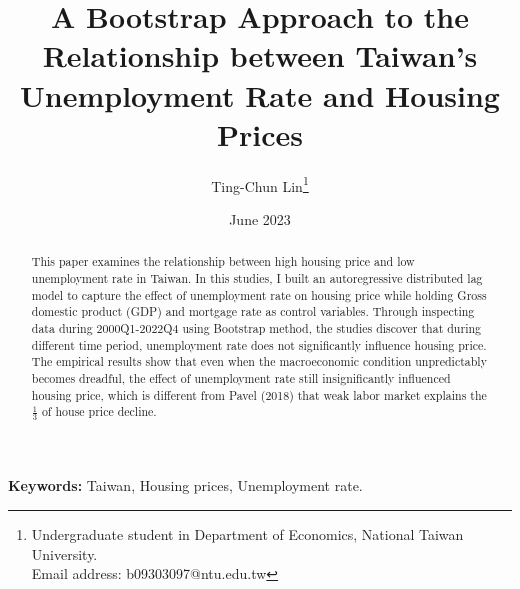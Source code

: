 \documentclass[12pt]{article}
\title{ A Bootstrap Approach to the Relationship between Taiwan's Unemployment Rate and Housing Prices }
\author{Ting-Chun Lin\thanks{
Undergraduate student in Department of Economics, National Taiwan University.\\ Email address: b09303097@ntu.edu.tw
}
}
\date{June 2023}
\begin{document}
\maketitle

\begin{abstract}
{  
    This paper examines the relationship between high housing price and low unemployment rate in Taiwan. In this studies, I built an autoregressive distributed lag model to capture the effect of unemployment rate on housing price while holding Gross domestic product (GDP) and mortgage rate as control variables. Through inspecting data during 2000Q1-2022Q4 using Bootstrap method, the studies discover that during different time period, unemployment rate does not significantly influence housing price. The empirical results show that even when the macroeconomic condition unpredictably becomes dreadful, the effect of unemployment rate still insignificantly influenced housing price, which is different from Pavel (2018) that weak labor market explains the $\frac{1}{3}$ of house price decline.
    }
\end{abstract}
\textbf{Keywords:} Taiwan, Housing prices, Unemployment rate.
\newpage
\end{document}
